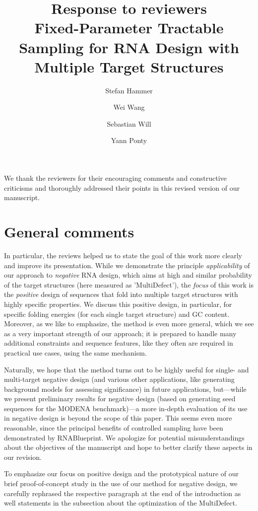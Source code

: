 \documentclass[11pt,hyperref]{article} %
\title{Response to reviewers\\[.3em]Fixed-Parameter Tractable Sampling for RNA Design with Multiple Target Structures}
\author{
Stefan Hammer \and Wei Wang \and Sebastian Will \and Yann Ponty}
\date{} %
\begin{document}
\maketitle

We thank the reviewers for their encouraging comments and constructive criticisms and thoroughly addressed their points in this revised version of our manuscript.

\section{General comments}

In particular, the reviews helped us to state the goal of this work more clearly and improve its presentation. While we demonstrate the principle \emph{applicability} of our approach to \emph{negative} RNA design, which  aims at high and similar probability of the target structures (here measured as 'MultiDefect'), the \emph{focus} of this work is the \emph{positive} design of sequences that fold into multiple target structures with highly specific properties. We discuss this positive design, in particular, for specific folding energies (for each single target structure) and GC content. Moreover, as we like to emphasize, the method is even more general, which we see as a very important strength of our approach; it is prepared to handle many additional constraints and sequence features, like they often are required in practical use cases, using the same mechanism. 

Naturally, we hope that the method turns out to be highly useful for single- and multi-target negative design (and various other applications, like generating background models for assessing significance) in future applications, but---while we present preliminary results for negative design (based on generating seed sequences for the MODENA benchmark)---a more in-depth evaluation of its use in negative design is beyond the scope of this paper. This seems even more reasonable, since the principal benefits of controlled sampling  have been demonstrated by RNABlueprint. We apologize for potential misunderstandings about the objectives of the manuscript and hope to better clarify these aspects in our revision.

To emphasize our focus on positive design and the prototypical nature of our brief proof-of-concept study in the use of our method for negative design, we carefully rephrased the respective paragraph at the end of the introduction as well statements in the subsection about the optimization of the MultiDefect. 
\end{document}
